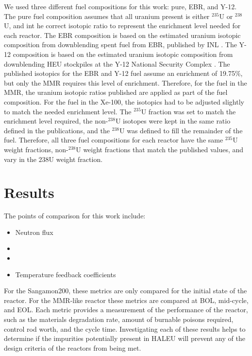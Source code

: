 We used three different fuel compositions for this work: pure, \gls{EBR}, 
and Y-12. The pure fuel composition assumes that all uranium present is 
either $^{235}$U or $^{238}$U, and int he correct isotopic ratio to 
represent the enrichment level needed for each reactor. The \gls{EBR} 
composition is based on the estimated uranium isotopic composition from 
downblending spent fuel from \gls{EBR}, published by \gls{INL} 
\cite{vaden_isotopic_2018}. The Y-12 composition is based on the 
estimated uranium isotopic composition from downblending \gls{HEU} 
stockpiles at the Y-12 National Security Complex \cite{nelson_foreign_2010}.
The published isotopics for the \gls{EBR} and Y-12 fuel assume an enrichment 
of 19.75\%, but only the \gls{MMR} requires this level of enrichment. 
Therefore, for the fuel in the \gls{MMR}, the uranium isotopic ratios 
published are applied as part of the fuel composition. For the fuel in the 
Xe-100, the isotopics had to be adjusted slightly to match the needed 
enrichment level. The $^{235}$U fraction was set to match the 
enrichment level required, the non-$^{238}$U isotopes were kept in the 
same ratio defined in the publications, and the $^{238}$U was defined to fill 
the remainder of the fuel. Therefore, all three fuel compositions for each 
reactor have the same $^{235}$U weight fractions, non-$^{238}$U weight
fractions that match the published values, and vary in the ${238}$U 
weight fraction. 

\section{Results}
The points of comparison for this work include:
\begin{itemize}
        \item Neutron flux 
        \item \keff 
        \item \betaEff
        \item Temperature feedback coefficients
\end{itemize}

For the Sangamon200, these metrics are only compared for the initial 
state of the reactor. For the \gls{MMR}-like reactor these metrics 
are compared at \gls{BOL}, mid-cycle, and \gls{EOL}. Each metric provides a 
measurement of the performance of 
the reactor, such as the materials degradation rate, amount of burnable 
poisons required, control rod worth, and the cycle time. Investigating 
each of these results helps to determine if the impurities potentially 
present in \gls{HALEU} will prevent any of the design criteria of the 
reactors from being met. 

